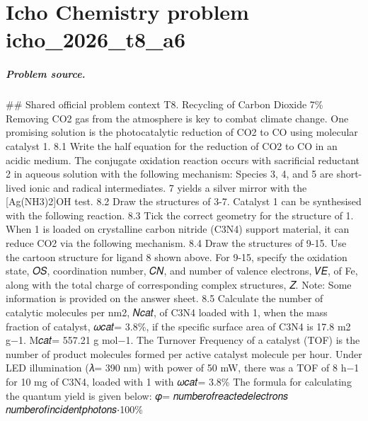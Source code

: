 
\chapter{Icho Chemistry problem icho\_2026\_t8\_a6}
\label{ch:IChO2026Problems_problem_icho_2026_t8_a6}

\paragraph{Problem source.}
\#\# Shared official problem context
T8. Recycling of Carbon Dioxide 7\% Removing CO2 gas from the atmosphere is key to combat climate change. One promising solution is the photocatalytic reduction of CO2 to CO using molecular catalyst 1. 8.1 Write the half equation for the reduction of CO2 to CO in an acidic medium. The conjugate oxidation reaction occurs with sacrificial reductant 2 in aqueous solution with the following mechanism: Species 3, 4, and 5 are short-lived ionic and radical intermediates. 7 yields a silver mirror with the [Ag(NH3)2]OH test. 8.2 Draw the structures of 3-7. Catalyst 1 can be synthesised with the following reaction. 8.3 Tick the correct geometry for the structure of 1. When 1 is loaded on crystalline carbon nitride (C3N4) support material, it can reduce CO2 via the following mechanism. 8.4 Draw the structures of 9-15. Use the cartoon structure for ligand 8 shown above. For 9-15, specify the oxidation state, 𝑂𝑆, coordination number, 𝐶𝑁, and number of valence electrons, 𝑉𝐸, of Fe, along with the total charge of corresponding complex structures, 𝑍. Note: Some information is provided on the answer sheet. 8.5 Calculate the number of catalytic molecules per nm2, 𝑁𝑐𝑎𝑡, of C3N4 loaded with 1, when the mass fraction of catalyst, 𝜔𝑐𝑎𝑡= 3.8\%, if the specific surface area of C3N4 is 17.8 m2 g−1. M𝑐𝑎𝑡= 557.21 g mol−1. The Turnover Frequency of a catalyst (TOF) is the number of product molecules formed per active catalyst molecule per hour. Under LED illumination (𝜆= 390 nm) with power of 50 mW, there was a TOF of 8 h−1 for 10 mg of C3N4, loaded with 1 with 𝜔𝑐𝑎𝑡= 3.8\% The formula for calculating the quantum yield is given below: 𝜑= 𝑛𝑢𝑚𝑏𝑒𝑟𝑜𝑓𝑟𝑒𝑎𝑐𝑡𝑒𝑑𝑒𝑙𝑒𝑐𝑡𝑟𝑜𝑛𝑠 𝑛𝑢𝑚𝑏𝑒𝑟𝑜𝑓𝑖𝑛𝑐𝑖𝑑𝑒𝑛𝑡𝑝ℎ𝑜𝑡𝑜𝑛𝑠⋅100\%

